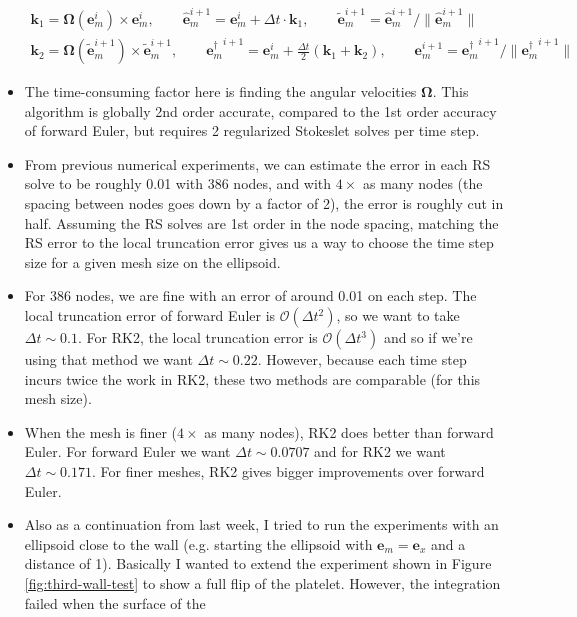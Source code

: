 \documentclass{article}
\newcommand{\vect}[1]{\boldsymbol{\mathbf{#1}}}
\begin{document}
\begin{itemize}
  \begin{align*}
    \vect{k}_1 = \vect{\Omega}(\vect{e}_m^i) \times \vect{e}_m^i,
    \qquad \hat{\vect{e}}_m^{i+1} = \vect{e}_m^i + \Delta t \cdot
    \vect{k}_1, \qquad \tilde{\vect{e}}_m^{i+1} =
    \hat{\vect{e}}_m^{i+1} / \|\hat{\vect{e}}_m^{i+1}\| \\ 
    \vect{k}_2 = \vect{\Omega}(\tilde{\vect{e}}_m^{i+1}) \times
    \tilde{\vect{e}}_m^{i+1}, \qquad {\vect{e}_m^\dag}^{i+1} =
    \vect{e}_m^i + \frac{\Delta t}{2} (\vect{k}_1 + \vect{k}_2),
    \qquad \vect{e}_m^{i+1} = {\vect{e}_m^\dag}^{i+1} /
    \|{\vect{e}_m^\dag}^{i+1}\|
  \end{align*}
\item The time-consuming factor here is finding the angular velocities
  $\vect{\Omega}$. This algorithm is globally 2nd order accurate,
  compared to the 1st order accuracy of forward Euler, but requires 2
  regularized Stokeslet solves per time step.
\item From previous numerical experiments, we can estimate the error
  in each RS solve to be roughly 0.01 with 386 nodes, and with
  $4\times$ as many nodes (the spacing between nodes goes down by a
  factor of 2), the error is roughly cut in half. Assuming
  the RS solves are 1st order in the node spacing, matching the RS
  error to the local truncation error gives us a way to choose the
  time step size for a given mesh size on the ellipsoid.
\item For 386 nodes, we are fine with an error of around 0.01 on each
  step. The local truncation error of forward Euler is
  $\mathcal{O}(\Delta t^2)$, so we want to take $\Delta t \sim
  0.1$. For RK2, the local truncation error is $\mathcal{O}(\Delta
  t^3)$ and so if we're using that method we want $\Delta t \sim
  0.22$. However, because each time step incurs twice the work in RK2,
  these two methods are comparable (for this mesh size).
\item When the mesh is finer ($4\times$ as many nodes), RK2 does
  better than forward Euler. For forward Euler we want $\Delta t \sim
  0.0707$ and for RK2 we want $\Delta t \sim 0.171$. For finer meshes,
  RK2 gives bigger improvements over forward Euler.
\item Also as a continuation from last week, I tried to run the
  experiments with an ellipsoid close to the wall (e.g. starting the
  ellipsoid with $\vect{e}_m = \vect{e}_x$ and a distance of
  1). Basically I wanted to extend the experiment shown in Figure
  \ref{fig:third-wall-test} to show a full flip of the
  platelet. However, the integration failed when the surface of the

\end{itemize}
\end{document}
